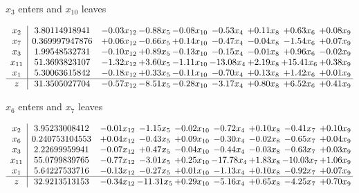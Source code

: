 \documentclass[8pt]{article}
\begin{document}
 $ x_{3} $ enters and $ x_{10} $ leaves 

 \[\begin{array}{c| c c@{\hskip 2pt} c@{\hskip 2pt} c@{\hskip 2pt} c@{\hskip 2pt} c@{\hskip 2pt} c@{\hskip 2pt} c@{\hskip 2pt} }
 x_{2}   &  3.80114918941 & -0.03 x_{12} & -0.88 x_{5} & -0.08 x_{10} & -0.53 x_{4} & +  0.11 x_{8} & +  0.63 x_{6} & +  0.08 x_{9}\\
 x_{7}   &  0.369997947876 & +  0.06 x_{12} & -0.66 x_{5} & +  0.14 x_{10} & -0.47 x_{4} & -0.04 x_{8} & -1.54 x_{6} & +  0.07 x_{9}\\
 x_{3}   &  1.99548532731 & -0.10 x_{12} & +  0.89 x_{5} & -0.13 x_{10} & -0.15 x_{4} & -0.01 x_{8} & +  0.96 x_{6} & -0.02 x_{9}\\
 x_{11}   &  51.3693823107 & -1.32 x_{12} & +  3.60 x_{5} & -1.11 x_{10} & -13.08 x_{4} & +  2.19 x_{8} & + 15.41 x_{6} & +  0.38 x_{9}\\
 x_{1}   &  5.30063615842 & -0.18 x_{12} & +  0.33 x_{5} & -0.11 x_{10} & -0.70 x_{4} & +  0.13 x_{8} & +  1.42 x_{6} & +  0.01 x_{9}\\
\hline
z    &  31.3505027704 & -0.57 x_{12} & -8.51 x_{5} & -0.28 x_{10} & -3.17 x_{4} & +  0.80 x_{8} & +  6.52 x_{6} & +  0.41 x_{9}\\
\end{array}\]


 $ x_{6} $ enters and $ x_{7} $ leaves 

 \[\begin{array}{c| c c@{\hskip 2pt} c@{\hskip 2pt} c@{\hskip 2pt} c@{\hskip 2pt} c@{\hskip 2pt} c@{\hskip 2pt} c@{\hskip 2pt} }
 x_{2}   &  3.95233008412 & -0.01 x_{12} & -1.15 x_{5} & -0.02 x_{10} & -0.72 x_{4} & +  0.10 x_{8} & -0.41 x_{7} & +  0.10 x_{9}\\
 x_{6}   &  0.240753104553 & +  0.04 x_{12} & -0.43 x_{5} & +  0.09 x_{10} & -0.30 x_{4} & -0.02 x_{8} & -0.65 x_{7} & +  0.04 x_{9}\\
 x_{3}   &  2.22699959941 & -0.07 x_{12} & +  0.47 x_{5} & -0.04 x_{10} & -0.44 x_{4} & -0.03 x_{8} & -0.63 x_{7} & +  0.03 x_{9}\\
 x_{11}   &  55.0799839765 & -0.77 x_{12} & -3.01 x_{5} & +  0.25 x_{10} & -17.78 x_{4} & +  1.83 x_{8} & -10.03 x_{7} & +  1.06 x_{9}\\
 x_{1}   &  5.64227533716 & -0.13 x_{12} & -0.27 x_{5} & +  0.01 x_{10} & -1.13 x_{4} & +  0.10 x_{8} & -0.92 x_{7} & +  0.07 x_{9}\\
\hline
z    &  32.9213513153 & -0.34 x_{12} & -11.31 x_{5} & +  0.29 x_{10} & -5.16 x_{4} & +  0.65 x_{8} & -4.25 x_{7} & +  0.70 x_{9}\\
\end{array}\]
\end{document}
